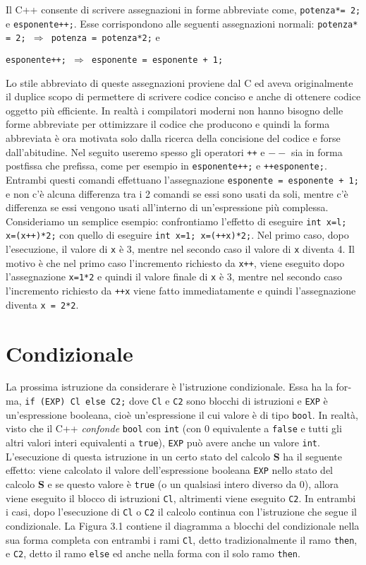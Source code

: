 Il C++ consente di scrivere assegnazioni in forme abbreviate come, \texttt{potenza*= 2;} e \texttt{esponente++;}. Esse corrispondono alle seguenti assegnazioni normali: \texttt{potenza* = 2; $\Rightarrow{}$ potenza = potenza*2;} e 

\noindent \texttt{esponente++; $\Rightarrow{}$ esponente = esponente + 1;}

\noindent Lo stile abbreviato di queste assegnazioni proviene dal C ed aveva originalmente il duplice scopo di permettere di scrivere codice conciso e anche di ottenere codice oggetto più efficiente.
In realtà i compilatori moderni non hanno bisogno delle forme abbreviate per ottimizzare il codice che producono e quindi la forma abbreviata è ora motivata solo dalla ricerca della concisione del codice e forse dall'abitudine.
Nel seguito useremo spesso gli operatori \texttt{++} e \texttt{$--$} sia in forma postfissa che prefissa, come per esempio in \texttt{esponente++;} e \texttt{++esponente;}.
Entrambi questi comandi effettuano l'assegnazione \texttt{esponente = esponente + 1;} e non c'è alcuna differenza tra i 2 comandi se essi sono usati da soli, mentre c'è differenza se essi vengono usati all'interno di un'espressione più complessa. Consideriamo un semplice esempio: confrontiamo l'effetto di eseguire \texttt{int x=l; x=(x++)*2;} con quello di eseguire \texttt{int x=1; x=(++x)*2;}.
Nel primo caso, dopo l'esecuzione, il valore di \texttt{x} è 3, mentre nel secondo caso il valore di \texttt{x} diventa 4.
Il motivo è che nel primo caso l'incremento richiesto da \texttt{x++}, viene eseguito dopo l'assegnazione \texttt{x=1*2} e quindi il valore finale di \texttt{x} è 3, mentre nel secondo caso l'incremento richiesto da \texttt{++x} viene fatto immediatamente e quindi l'assegnazione diventa \texttt{x = 2*2}.

\section{Condizionale}
La prossima istruzione da considerare è l'istruzione condizionale.
Essa ha la for­ma, \texttt{if (EXP) Cl else C2;} dove \texttt{Cl} e \texttt{C2} sono blocchi di istruzioni e \texttt{EXP} è un'espressione booleana, cioè un'espressione il cui valore è di tipo \texttt{bool}.
In realtà, visto che il C++ \textit{confonde} \texttt{bool} con \texttt{int} (con 0 equivalente a \texttt{false} e tutti gli altri valori interi equivalenti a \texttt{true}), \texttt{EXP} può avere anche un valore \texttt{int}.
L'esecuzione di questa istruzione in un certo stato del calcolo \textbf{S} ha il seguente effetto: viene calcolato il valore dell'espressione booleana \texttt{EXP} nello stato del calcolo \textbf{S} e se questo valore è \texttt{true} (o un qualsiasi intero diverso da 0), allora viene eseguito il blocco di istruzioni \texttt{Cl}, altrimenti viene eseguito \texttt{C2}.
In entrambi i casi, dopo l'esecuzione di \texttt{Cl} o \texttt{C2} il calcolo continua con l'istruzione che segue il condizionale.
La Figura 3.1 contiene il diagramma a blocchi del condizionale nella sua forma completa con entrambi i rami \texttt{Cl}, detto tradizionalmente il ramo \texttt{then}, e \texttt{C2}, detto il ramo \texttt{else} ed anche nella forma con il solo ramo \texttt{then}. 

